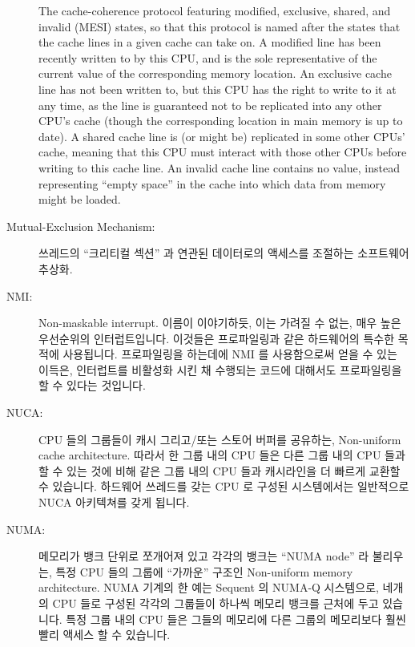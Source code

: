 \begin{description}
	The
	cache-coherence protocol featuring
	modified, exclusive, shared, and invalid (MESI) states,
	so that this protocol is named after the states that the
	cache lines in a given cache can take on.
	A modified line has been recently written to by this CPU,
	and is the sole representative of the current value of
	the corresponding memory location.
	An exclusive cache line has not been written to, but this
	CPU has the right to write to it at any time, as the line
	is guaranteed not to be replicated into any other CPU's cache
	(though the corresponding location in main memory is up to date).
	A shared cache line is (or might be) replicated in some other
	CPUs' cache, meaning that this CPU must interact with those other
	CPUs before writing to this cache line.
	An invalid cache line contains no value, instead representing
	``empty space'' in the cache into which data from memory might
	be loaded.
	\fi
\item[Mutual-Exclusion Mechanism:]
	쓰레드의 ``크리티컬 섹션'' 과 연관된 데이터로의 액세스를 조절하는
	소프트웨어 추상화.
	\iffalse

	A software abstraction that regulates threads' access to
	``critical sections'' and corresponding data.
	\fi
\item[NMI:]
	Non-maskable interrupt.
	이름이 이야기하듯, 이는 가려질 수 없는, 매우 높은 우선순위의
	인터럽트입니다.
	이것들은 프로파일링과 같은 하드웨어의 특수한 목적에 사용됩니다.
	프로파일링을 하는데에 NMI 를 사용함으로써 얻을 수 있는 이득은,
	인터럽트를 비활성화 시킨 채 수행되는 코드에 대해서도 프로파일링을 할 수
	있다는 것입니다.
	\iffalse

	Non-maskable interrupt.
	As the name indicates, this is an extremely high-priority
	interrupt that cannot be masked.
	These are used for hardware-specific purposes such as profiling.
	The advantage of using NMIs for profiling is that it allows you
	to profile code that runs with interrupts disabled.
	\fi
\item[NUCA:]
	CPU 들의 그룹들이 캐시 그리고/또는 스토어 버퍼를 공유하는, Non-uniform
	cache architecture.
	따라서 한 그룹 내의 CPU 들은 다른 그룹 내의 CPU 들과 할 수 있는 것에
	비해 같은 그룹 내의 CPU 들과 캐시라인을 더 빠르게 교환할 수 있습니다.
	하드웨어 쓰레드를 갖는 CPU 로 구성된 시스템에서는 일반적으로 NUCA
	아키텍쳐를 갖게 됩니다.
	\iffalse

	Non-uniform cache architecture, where groups of CPUs share
	caches and/or store buffers.
	CPUs in a group can therefore exchange cache lines with each
	other much more quickly than they can with CPUs in other groups.
	Systems comprised of CPUs with hardware threads will generally
	have a NUCA architecture.
	\fi
\item[NUMA:]
	메모리가 뱅크 단위로 쪼개어져 있고 각각의 뱅크는 ``NUMA node'' 라
	불리우는, 특정 CPU 들의 그룹에 ``가까운'' 구조인 Non-uniform memory
	architecture.
	NUMA 기계의 한 예는 Sequent 의 NUMA-Q 시스템으로, 네개의 CPU 들로
	구성된 각각의 그룹들이 하나씩 메모리 뱅크를 근처에 두고 있습니다.
	특정 그룹 내의 CPU 들은 그들의 메모리에 다른 그룹의 메모리보다 훨씬
	빨리 액세스 할 수 있습니다.
	\iffalse


\end{description}
